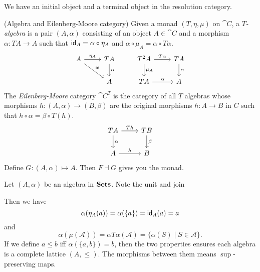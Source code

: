 We have an initial object and a terminal object in the resolution
category.

\begin{definition}
    (Algebra and Eilenberg-Moore category) Given a monad $(T,\eta,\mu)$ 
    on $\cat{C}$, a {\it $T$-algebra} is a pair $(A,\alpha)$ consisting
    of an object $A\in\cat{C}$ and a morphism $\alpha: TA\to A$ such that
    $\text{\sf id}_A=\alpha\circ\eta_A$ and $\alpha\circ\mu_A=\alpha\circ T\alpha$.
    $$
    \begin{tikzcd}
        A \arrow{r}{\eta_A} \arrow{rd}{\id} & TA\arrow{d}{\alpha}
        & T^2A \arrow{r}{T\alpha}\arrow{d}{\mu_A} & TA\arrow{d}{\alpha}\\
        & A & TA\arrow{r}{\alpha} & A
    \end{tikzcd}
    $$
    The {\it Eilenberg-Moore} category $\cat{C}^T$ is the category of 
    all $T$ algebras whose morphisms $h: (A,\alpha)\to(B,\beta)$ are 
    the original morphisms $h: A\to B$ in $C$ such that 
    $h\circ\alpha=\beta\circ T(h)$.
    $$
    \begin{tikzcd}
        TA\arrow{d}{\alpha} \arrow{r}{Th} & TB\arrow{d}{\beta} \\
        A \arrow{r}{h} & B
    \end{tikzcd}
    $$
    Define $G:(A,\alpha)\mapsto A$. Then $F\dashv G$ gives you the monad.
\end{definition}\bigskip

Let $(A,\alpha)$ be an algebra in $\mathbf{Sets}$. Note the unit and join

Then we have $$\alpha(\eta_A(a))=\alpha(\{a\})=\text{\sf id}_A(a)=a$$ and
$$\alpha(\mu(\mathscr{A}))=\alpha T\alpha(\mathscr{A})=\{\alpha(S)\mid
S\in\mathscr{A}\}.$$ If we define $a\le b$ iff $\alpha(\{a,b\})=b$,
then the two properties ensures each algebra is a complete lattice
$(A,\le)$. The morphisms between them means $\sup$-preserving maps. 

